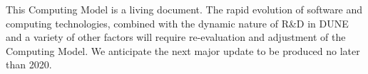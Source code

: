 
This Computing Model is a living document.
The rapid evolution of software and computing technologies, combined with the dynamic nature of R\&D in DUNE
and a variety of other factors will require re-evaluation and adjustment of the Computing Model. 
We anticipate the next major update to be produced no later than 2020.

